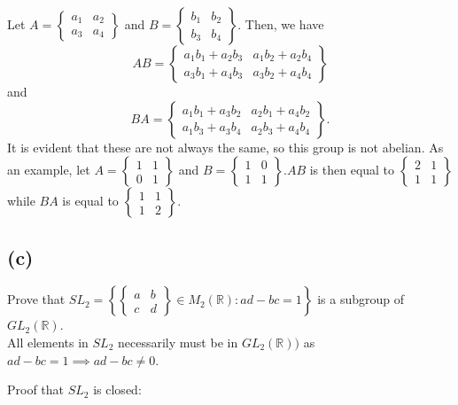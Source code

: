 \documentclass[12pt,letterpaper]{article}
\begin{document}
Let \(A = \begin{Bmatrix} a_{1} & a_{2} \\ a_{3} & a_{4} \end{Bmatrix}\) and \(B = \begin{Bmatrix} b_{1} & b_{2} \\ b_{3} & b_{4} \end{Bmatrix}\). Then, we have \[AB = \begin{Bmatrix} a_{1}b_{1} + a_{2}b_{3} & a_{1}b_{2} + a_{2}b_{4} \\ a_{3}b_{1} + a_{4}b_{3} & a_{3}b_{2} + a_{4}b_{4} \end{Bmatrix}\] and \[BA = \begin{Bmatrix} a_{1}b_{1} + a_{3}b_{2} & a_{2}b_{1} + a_{4}b_{2} \\ a_{1}b_{3} + a_{3}b_{4} & a_{2}b_{3} + a_{4}b_{4} \end{Bmatrix}. \] It is evident that these are not always the same, so this group is not abelian. As an example, let \(A = \begin{Bmatrix}  1 & 1 \\ 0 & 1 \end{Bmatrix}\) and \(B = \begin{Bmatrix} 1 & 0 \\ 1 & 1 \end{Bmatrix}\).\(AB\) is then equal to \(\begin{Bmatrix} 2 & 1 \\ 1 & 1 \end{Bmatrix}\) while \(BA\) is equal to \(\begin{Bmatrix} 1 & 1 \\ 1 & 2 \end{Bmatrix}\).

\subsection*{(c)}
Prove that \(SL_{2} = \left\{ \begin{Bmatrix} a & b \\ c & d \end{Bmatrix} \in M_{2}(\mathbb{R}) : ad - bc = 1 \right\}\) is a subgroup of \(GL_{2}(\mathbb{R})\). \\

All elements in \(SL_{2}\) necessarily must be in \(GL_{2}(\mathbb{R}))\) as \(ad - bc = 1 \implies ad -bc \neq 0\).

Proof that \(SL_{2}\) is closed: \\
\end{document}
